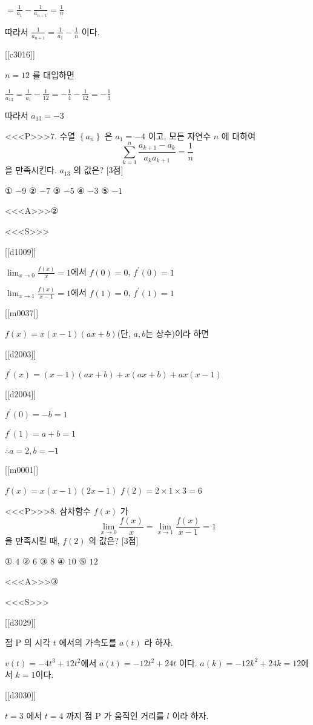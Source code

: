 \documentclass{oblivoir}
\begin{document}
$=\frac{1}{a_{1}}-\frac{1}{a_{n+1}}=\frac{1}{n}$

따라서 $\frac{1}{a_{n+1}}=\frac{1}{a_{1}}-\frac{1}{n}$ 이다.

[[c3016]]

$n=12$ 를 대입하면

$\frac{1}{a_{13}}=\frac{1}{a_{1}}-\frac{1}{12}=-\frac{1}{4}-\frac{1}{12}=-\frac{1}{3}$

따라서 $a_{13}=-3$


<<<P>>>7. 수열 $\left\{a_{n}\right\}$ 은 $a_{1}=-4$ 이고, 모든 자연수 $n$ 에 대하여
$$
\sum_{k=1}^{n} \frac{a_{k+1}-a_{k}}{a_{k} a_{k+1}}=\frac{1}{n}
$$
을 만족시킨다. $a_{13}$ 의 값은? [3점]

① $-9$
② $-7$
③ $-5$
④ $-3$
⑤ $-1$

<<<A>>>②

<<<S>>>

[[d1009]]

$\lim _{x \rightarrow 0} \frac{f(x)}{x}=1$에서 $f(0)=0$, $f^{\prime}(0)=1$

$\lim _{x \rightarrow 1} \frac{f(x)}{x-1}=1$에서 $f(1)=0$, $f^{\prime}(1)=1$

[[m0037]]

$f(x)=x(x-1)(a x+b)$(단, $a, b$는 상수)이라 하면

[[d2003]]

$f^{\prime}(x)=(x-1)(a x+b)+x(a x+b)+a x(x-1)$

[[d2004]]

$f^{\prime}(0)=-b=1$

$f^{\prime}(1)=a+b=1$

$\therefore a=2, b=-1$

[[m0001]]

$f(x)=x(x-1)(2 x-1)$
$f(2)=2 \times 1 \times 3=6$


<<<P>>>8. 삼차함수 $f(x)$ 가
$$
\lim _{x \rightarrow 0} \frac{f(x)}{x}=\lim _{x \rightarrow 1} \frac{f(x)}{x-1}=1
$$
을 만족시킬 때, $f(2)$ 의 값은? [3점]

① $4$
② $6$
③ $8$
④ $10$
⑤ $12$

<<<A>>>③

<<<S>>>

[[d3029]]

점 $\mathrm{P}$ 의 시각 $t$ 에서의 가속도를 $a(t)$ 라 하자.

$v(t)=-4 t^{3}+12 t^{2}$에서 $a(t)=-12 t^{2}+24 t $ 이다.
$a(k)=-12 k^{2}+24 k=12$에서 $k=1$이다.

[[d3030]]

$t=3$ 에서 $t=4$ 까지 점 $\mathrm{P}$ 가 움직인 거리를 $l$ 이라 하자.
\end{document}
